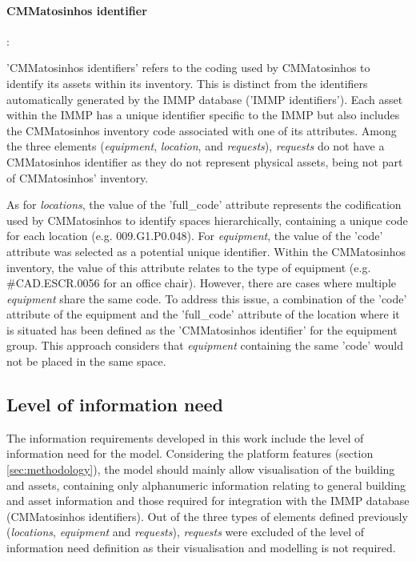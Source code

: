 \documentclass[a4paper, 10pt, twocolumn, twoside]{article}
\begin{document}
\paragraph{CMMatosinhos identifier}:

'CMMatosinhos identifiers' refers to the coding used by CMMatosinhos to identify its assets within its inventory. This is distinct from the identifiers automatically generated by the IMMP database ('IMMP identifiers'). Each asset within the IMMP has a unique identifier specific to the IMMP but also includes the CMMatosinhos inventory code associated with one of its attributes. Among the three elements (\emph{equipment}, \emph{location}, and \emph{requests}), \emph{requests} do not have a CMMatosinhos identifier as they do not represent physical assets, being not part of CMMatosinhos' inventory.

As for \emph{locations}, the value of the 'full\_code' attribute represents the codification used by CMMatosinhos to identify spaces hierarchically, containing a unique code for each location (e.g. 009.G1.P0.048). For \emph{equipment}, the value of the 'code' attribute was selected as a potential unique identifier. Within the CMMatosinhos inventory, the value of this attribute relates to the type of equipment (e.g. \#CAD.ESCR.0056 for an office chair). However, there are cases where multiple \emph{equipment} share the same code. To address this issue, a combination of the 'code' attribute of the equipment and the 'full\_code' attribute of the location where it is situated has been defined as the 'CMMatosinhos identifier' for the equipment group. This approach considers that \emph{equipment} containing the same 'code' would not be placed in the same space.

\subsection{Level of information need}
\label{subsec:loin}

The information requirements developed in this work include the level of information need \cite{17412-1} for the model. Considering the platform features (section \ref{sec:methodology}), the model should mainly allow visualisation of the building and assets, containing only alphanumeric information relating to general building and asset information and those required for integration with the IMMP database (CMMatosinhos identifiers). Out of the three types of elements defined previously (\emph{locations}, \emph{equipment} and \emph{requests}), \emph{requests} were excluded of the level of information need definition as their visualisation and modelling is not required.
\end{document}
